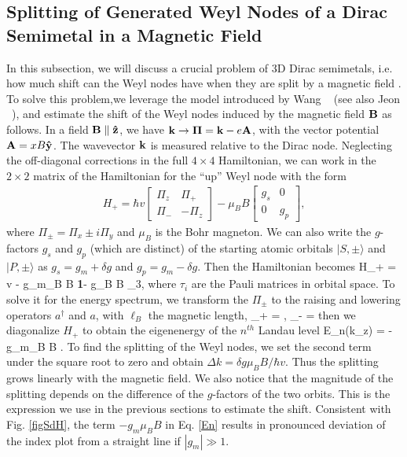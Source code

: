 \subsection{Splitting of Generated Weyl Nodes of a Dirac Semimetal in a Magnetic Field}
In this subsection, we will discuss a crucial problem of 3D Dirac semimetals, i.e. how much shift can the Weyl nodes have when they are split by a magnetic field . To solve this problem,we leverage the model introduced by Wang \etal~\cite{Wang2012} (see also Jeon \etal~\cite{Jeon2014}), and estimate the shift of the Weyl nodes induced by the magnetic field $\bf B$ as follows. In a field $\bf B\parallel \hat{z}$, we have ${\bf k \to \Pi} = {\bf k} - e{\bf A}$, with the vector potential ${\bf A} = xB{\bf \hat{y}}$. The wavevector $\bf k$ is measured relative to the Dirac node. Neglecting the off-diagonal corrections in the full $4\times4$ Hamiltonian, we can work in the
$2\times2$ matrix of the Hamiltonian for the ``up'' Weyl node with the form 
\begin{eqnarray}
H_+ = \hbar v\left[\begin{array}{cc}
						\Pi_z   &  \Pi_+   \\
						\Pi_-   &   -\Pi_z  
						\end{array}\right]
						-\mu_B B \left[\begin{array}{cc}
						g_s   &   0   \\
						0      &   g_p  
						\end{array}\right],
						\label{H1}
						\end{eqnarray}
where $\Pi_{\pm} = \Pi_x \pm i\Pi_y$ and $\mu_B$ is the Bohr magneton. We can also write the $g$-factors $g_s$ and $g_p$ (which are distinct) of the starting atomic orbitals $|S,\pm\rangle$ and $|P,\pm\rangle$ as $g_s = g_m + \delta g$ and $g_p = g_m - \delta g$. Then the Hamiltonian becomes
\be
H_+ = v{\bf \Pi\cdot }\boldsymbol{\tau} - g_m\mu_B B {\bf 1}- \delta g\mu_B B \tau_3,
\label{H2}
\ee
where $\tau_i$ are the Pauli matrices in orbital space.
To solve it for the energy spectrum, we transform the $\Pi_\pm$ to the raising and lowering operators $a^\dagger$ and $a$, with $\ell_B$ the magnetic length,
\be
\Pi_+ = , \quad \Pi_- = 
\label{Pi}
\ee
then we diagonalize $H_+$ to obtain the eigenenergy of the $n^{th}$ Landau level
\be
E_n(k_z) = -g_m\mu_B B \pm {}.
\label{En}
\ee
To find the splitting of the Weyl nodes, we set the second term under the square root to zero and obtain $\Delta k = \delta g\mu_B B/\hbar v$. Thus the splitting grows linearly with the magnetic field. We also notice that the magnitude of the splitting depends on the difference of the $g$-factors of the two orbits. This is the expression we use in the previous sections to estimate the shift. Consistent with Fig. \ref{figSdH}, the term $-g_m\mu_B B$ in Eq. \ref{En} results in pronounced deviation of the index plot from a straight line if $|g_m|\gg 1$.

